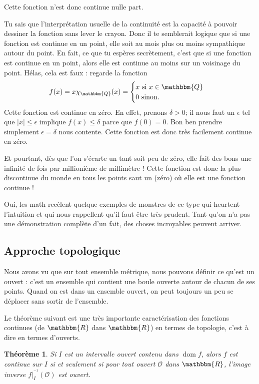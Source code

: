 \documentclass[a4paper,12pt]{book}
\newcommand{\eR}{\mathbbm{R}}
\newcommand{\eQ}{\mathbbm{Q}}
\DeclareMathOperator{\dom}{dom}
\newcounter{numtho}
\theoremstyle{mes_exemples}	\newtheorem{exemple}[numtho]{Exemple}
\theoremstyle{mes_tho}
\newtheorem{theorem}[numtho]{Théorème}
\newcommand{\mO}{\mathcal{O}}
\begin{document}
Cette fonction n'est donc continue nulle part. 

Tu sais que l'interprétation usuelle de la continuité est la capacité à pouvoir dessiner la fonction sans lever le crayon. Donc il te semblerait logique que si une fonction est continue en un point, elle soit au mois plus ou moins sympathique autour du point. En fait, ce que tu espères secrètement, c'est que si une fonction est continue en un point, alors elle est continue au moins sur un voisinage du point. Hélas, cela est faux : regarde la fonction
\[ 
  f(x)=x\chi_{\eQ}(x)=
\begin{cases}
x\text{ si $x\in\eQ$}\\
0\text{ sinon.}
\end{cases}
\]
Cette fonction est continue en zéro. En effet, prenons $\delta>0$; il nous faut un $\epsilon$ tel que $| x |\leq\epsilon$ implique $f(x)\leq \delta$ parce que $f(0)=0$. Bon ben prendre simplement $\epsilon=\delta$ nous contente. Cette fonction est donc très facilement continue en zéro.

Et pourtant, dès que l'on s'écarte un tant soit peu de zéro, elle fait des bons une infinité de fois par millionième de millimètre ! Cette fonction est donc la plus discontinue du monde en tous les points saut un (zéro) où elle est une fonction continue !

Oui, les math recèlent quelque exemples de monstres de ce type qui heurtent l'intuition et qui nous rappellent qu'il faut être très prudent. Tant qu'on n'a pas une démonstration complète d'un fait, des choses incroyables peuvent arriver.

\subsection{Approche topologique}

Nous avons vu que sur tout ensemble métrique, nous pouvons définir ce qu'est un ouvert : c'est un ensemble qui contient une boule ouverte autour de chacun de ses points. Quand on est dans un ensemble ouvert, on peut toujours un peu se déplacer sans sortir de l'ensemble.

Le théorème suivant est une très importante caractérisation des fonctions continues (de $\eR$ dans $\eR$) en termes de topologie, c'est à dire en termes d'ouverts.

\begin{theorem}		\label{ThoContInvOuvert}
Si $I$ est un intervalle ouvert contenu dans $\dom f$, alors $f$ est continue sur $I$ si et seulement si pour tout ouvert $\mO$ dans $\eR$, l'image inverse $f|_I^{^{-1}}(\mO)$ est ouvert.
\end{theorem}
\end{document}
